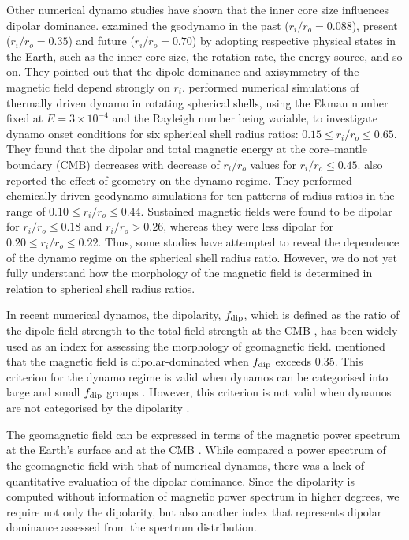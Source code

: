 Other numerical dynamo studies have shown that the inner core size influences dipolar dominance. 
\citet{Roberts:2001} examined the geodynamo in the past ($r_i / r_o = 0.088$), present ($r_i / r_o = 0.35$) and future ($r_i / r_o = 0.70$) by adopting respective physical states in the Earth, such as the inner core size, the rotation rate, the energy source, and so on.
They pointed out that the dipole dominance and axisymmetry of the magnetic field depend strongly on $r_i$.
\citet{Heimpel:2005} performed numerical simulations of thermally driven dynamo in rotating spherical shells, using the Ekman number fixed at $E = 3 \times 10^{-4}$ and the Rayleigh number being variable, to investigate dynamo onset conditions for six spherical shell radius ratios:
$0.15 \le r_{i} / r_{o} \le 0.65$.
%
They found that the dipolar and total magnetic energy at the core–mantle boundary (CMB) decreases with decrease of $r_{i} / r_{o}$ values for
%
$r_{i} / r_{o} \le 0.45$.
%
\citet{Lhuillier:2019} also reported the effect of geometry on the dynamo regime. 
They performed chemically driven geodynamo simulations for ten patterns of radius ratios in the range of $0.10 \le r_{i} / r_{o} \le 0.44$.
%
Sustained magnetic fields were found to be dipolar for  $r_{i} / r_{o} \le 0.18$ and  $r_{i} / r_{o} > 0.26$, whereas they were less dipolar for $0.20 \le r_{i} / r_{o} \le 0.22$. 
Thus, some studies have attempted to reveal the dependence of the dynamo regime on the spherical shell radius ratio.
%
However, we do not yet fully understand how the morphology of the magnetic field is determined in relation to spherical shell radius ratios.

In recent numerical dynamos, the dipolarity, $f_{\rm dip}$, which is defined as the ratio of the dipole field strength to the total field strength at the CMB \citep{Uli:2006}, has been widely used as an index for assessing the morphology of geomagnetic field. 
\citet{Uli:2006} mentioned that the magnetic field is dipolar-dominated when $f_{\rm dip}$ exceeds 0.35. 
This criterion for the dynamo regime is valid when dynamos can be categorised into large and small $f_{\rm dip}$ groups \citep{Soderlund:2012}. However, this criterion is not valid when dynamos are not categorised by the dipolarity \citep{Aubert:2009}. 

The geomagnetic field can be expressed in terms of the magnetic power spectrum at the Earth’s surface \citep{Lowes:74} and at the CMB \citep{Langel:82}. 
While \citet{Kono:2002} compared a power spectrum of the geomagnetic field with that of numerical dynamos, there was a lack of quantitative evaluation of the dipolar dominance. 
Since the dipolarity is computed without information of magnetic power spectrum in higher degrees, we require not only the dipolarity, but also another index that represents dipolar dominance assessed from the spectrum distribution.

